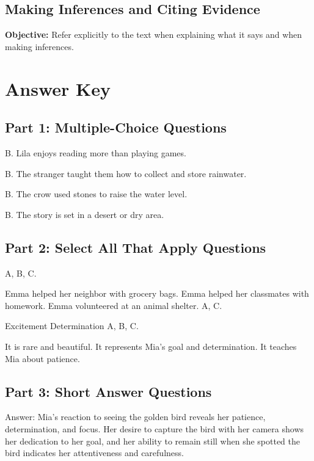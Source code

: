 \documentclass[12pt]{article}
\begin{document}
\subsection*{Making Inferences and Citing Evidence}
\onehalfspacing

\begin{tcolorbox}[colframe=black!40, colback=gray!0, title=Learning Objective]
\textbf{Objective:} Refer explicitly to the text when explaining what it says and when making inferences.
\end{tcolorbox}


\section*{Answer Key}

\subsection*{Part 1: Multiple-Choice Questions}

B. Lila enjoys reading more than playing games.

B. The stranger taught them how to collect and store rainwater.

B. The crow used stones to raise the water level.

B. The story is set in a desert or dry area.

\subsection*{Part 2: Select All That Apply Questions}

A, B, C.

Emma helped her neighbor with grocery bags.
Emma helped her classmates with homework.
Emma volunteered at an animal shelter.
A, C.

Excitement
Determination
A, B, C.

It is rare and beautiful.
It represents Mia’s goal and determination.
It teaches Mia about patience.
\subsection*{Part 3: Short Answer Questions}

Answer: Mia’s reaction to seeing the golden bird reveals her patience, determination, and focus. Her desire to capture the bird with her camera shows her dedication to her goal, and her ability to remain still when she spotted the bird indicates her attentiveness and carefulness.
\end{document}
